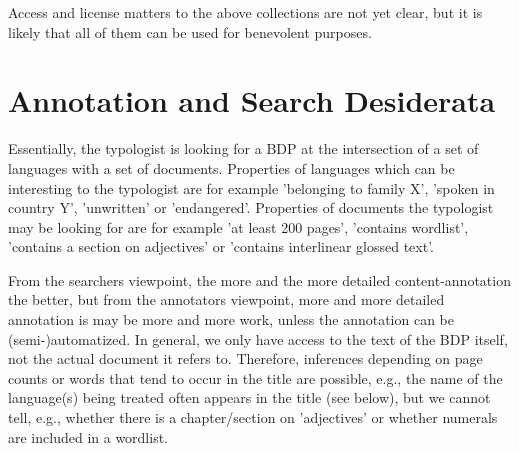 \documentclass[english,11pt,twoside]{article}
\begin{document}
Access and license matters to the above collections are not yet clear,
but it is likely that all of them can be used for benevolent purposes.




\section{Annotation and Search Desiderata}
Essentially, the typologist is looking for a BDP at the intersection of a set of languages with a set of documents. Properties of languages which can be interesting to the typologist are for example 'belonging to family X', 'spoken in country Y', 'unwritten' or 'endangered'. Properties of documents the typologist may be looking for are for example  'at least 200 pages', 'contains wordlist', 'contains a section on adjectives' or 'contains interlinear glossed text'.

From the searchers viewpoint, the more and the more detailed
content-annotation the better, but from the annotators viewpoint, more
and more detailed annotation is may be more and more work, unless the
annotation can be (semi-)automatized. In general, we only have access
to the text of the BDP itself, not the actual document it refers
to. Therefore, inferences depending on page counts or words that tend
to occur in the title are possible, e.g., the name of the language(s)
being treated often appears in the title (see below), but we cannot
tell, e.g., whether there is a chapter/section on 'adjectives' or
whether numerals are included in a wordlist.
\end{document}
